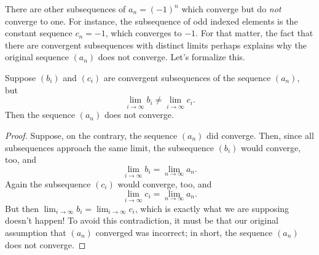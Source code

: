 \documentclass{ximera}
\begin{document}
There are other subsequences of $a_n = (-1)^n$ which converge but do
\textit{not} converge to one.  For instance, the subsequence of odd
indexed elements is the constant sequence $c_n = -1$, which converges to
$-1$.  For that matter, the fact that there are convergent
subsequences with distinct limits perhaps explains why the original
sequence $(a_n)$ does not converge.  Let's formalize this.

\begin{corollary}
  \label{corollary:different-subsequences-then-diverge}

  Suppose $(b_i)$ and $(c_i)$ are convergent subsequences of the sequence $(a_n)$, but
  $$
  \lim_{i \to \infty} b_i \neq \lim_{i \to \infty} c_i.
  $$
  Then the sequence $(a_n)$ does not converge.
\end{corollary}

\begin{proof}
  Suppose, on the contrary, the sequence $(a_n)$ did converge.  Then,
  since all subsequences approach the same limit, the subsequence
  $(b_i)$ would converge, too, and
  $$
  \lim_{i \to \infty} b_i = \lim_{n \to \infty} a_n.
  $$
  Again %
  the subsequence
  $(c_i)$ would converge, too, and
  $$
  \lim_{i \to \infty} c_i = \lim_{n \to \infty} a_n.
  $$
  But then $\lim_{i \to \infty} b_i = \lim_{i \to \infty} c_i$,
  which is exactly what we are supposing doesn't happen!  To avoid
  this contradiction, it must be that our original assumption that
  $(a_n)$ converged was incorrect; in short, the sequence $(a_n)$ does
  not converge.
\end{proof}
\end{document}
